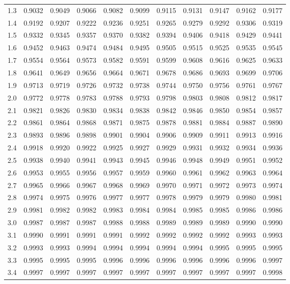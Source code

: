 \begin{frame}
{\begin{tabular}{l|llllllllll}
1.3 & 0.9032 & 0.9049 & 0.9066 & 0.9082 & 0.9099 & 0.9115 & 0.9131 & 0.9147 & 0.9162 & 0.9177 \\ 
1.4 & 0.9192 & 0.9207 & 0.9222 & 0.9236 & 0.9251 & 0.9265 & 0.9279 & 0.9292 & 0.9306 & 0.9319 \\ 
1.5 & 0.9332 & 0.9345 & 0.9357 & 0.9370 & 0.9382 & 0.9394 & 0.9406 & 0.9418 & 0.9429 & 0.9441 \\ 
1.6 & 0.9452 & 0.9463 & 0.9474 & 0.9484 & 0.9495 & 0.9505 & 0.9515 & 0.9525 & 0.9535 & 0.9545 \\ 
1.7 & 0.9554 & 0.9564 & 0.9573 & 0.9582 & 0.9591 & 0.9599 & 0.9608 & 0.9616 & 0.9625 & 0.9633 \\ 
1.8 & 0.9641 & 0.9649 & 0.9656 & 0.9664 & 0.9671 & 0.9678 & 0.9686 & 0.9693 & 0.9699 & 0.9706 \\ 
1.9 & 0.9713 & 0.9719 & 0.9726 & 0.9732 & 0.9738 & 0.9744 & 0.9750 & 0.9756 & 0.9761 & 0.9767 \\ 
2.0 & 0.9772 & 0.9778 & 0.9783 & 0.9788 & 0.9793 & 0.9798 & 0.9803 & 0.9808 & 0.9812 & 0.9817 \\ 
2.1 & 0.9821 & 0.9826 & 0.9830 & 0.9834 & 0.9838 & 0.9842 & 0.9846 & 0.9850 & 0.9854 & 0.9857 \\ 
2.2 & 0.9861 & 0.9864 & 0.9868 & 0.9871 & 0.9875 & 0.9878 & 0.9881 & 0.9884 & 0.9887 & 0.9890 \\ 
2.3 & 0.9893 & 0.9896 & 0.9898 & 0.9901 & 0.9904 & 0.9906 & 0.9909 & 0.9911 & 0.9913 & 0.9916 \\ 
2.4 & 0.9918 & 0.9920 & 0.9922 & 0.9925 & 0.9927 & 0.9929 & 0.9931 & 0.9932 & 0.9934 & 0.9936 \\ 
2.5 & 0.9938 & 0.9940 & 0.9941 & 0.9943 & 0.9945 & 0.9946 & 0.9948 & 0.9949 & 0.9951 & 0.9952 \\ 
2.6 & 0.9953 & 0.9955 & 0.9956 & 0.9957 & 0.9959 & 0.9960 & 0.9961 & 0.9962 & 0.9963 & 0.9964 \\ 
2.7 & 0.9965 & 0.9966 & 0.9967 & 0.9968 & 0.9969 & 0.9970 & 0.9971 & 0.9972 & 0.9973 & 0.9974 \\ 
2.8 & 0.9974 & 0.9975 & 0.9976 & 0.9977 & 0.9977 & 0.9978 & 0.9979 & 0.9979 & 0.9980 & 0.9981 \\ 
2.9 & 0.9981 & 0.9982 & 0.9982 & 0.9983 & 0.9984 & 0.9984 & 0.9985 & 0.9985 & 0.9986 & 0.9986 \\ 
3.0 & 0.9987 & 0.9987 & 0.9987 & 0.9988 & 0.9988 & 0.9989 & 0.9989 & 0.9989 & 0.9990 & 0.9990 \\ 
3.1 & 0.9990 & 0.9991 & 0.9991 & 0.9991 & 0.9992 & 0.9992 & 0.9992 & 0.9992 & 0.9993 & 0.9993 \\ 
3.2 & 0.9993 & 0.9993 & 0.9994 & 0.9994 & 0.9994 & 0.9994 & 0.9994 & 0.9995 & 0.9995 & 0.9995 \\ 
3.3 & 0.9995 & 0.9995 & 0.9995 & 0.9996 & 0.9996 & 0.9996 & 0.9996 & 0.9996 & 0.9996 & 0.9997 \\ 
3.4 & 0.9997 & 0.9997 & 0.9997 & 0.9997 & 0.9997 & 0.9997 & 0.9997 & 0.9997 & 0.9997 & 0.9998 
\end{tabular}

}

\end{frame}


